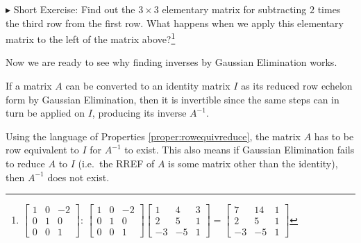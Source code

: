 $\blacktriangleright$ Short Exercise: Find out the $3 \times 3$ elementary matrix for subtracting $2$ times the third row from the first row. What happens when we apply this elementary matrix to the left of the matrix above?\footnote{$
\begin{bmatrix}
1 & 0 & -2 \\
0 & 1 & 0 \\
0 & 0 & 1
\end{bmatrix}$:  
$\begin{bmatrix}
1 & 0 & -2 \\
0 & 1 & 0 \\
0 & 0 & 1
\end{bmatrix}
\begin{bmatrix}
1 & 4 & 3 \\
2 & 5 & 1 \\
-3 & -5 & 1
\end{bmatrix}
=
\begin{bmatrix}
7 & 14 & 1 \\
2 & 5 & 1 \\
-3 & -5 & 1
\end{bmatrix}
$}\par
Now we are ready to see why finding inverses by Gaussian Elimination works.
\begin{thm}
\label{thm:Gausselimprincip}
If a matrix $A$ can be converted to an identity matrix $I$ as its reduced row echelon form by Gaussian Elimination, then it is invertible since the same steps can in turn be applied on $I$, producing its inverse $A^{-1}$. 
\end{thm}
Using the language of Properties \ref{proper:rowequivreduce}, the matrix $A$ has to be row equivalent to $I$ for $A^{-1}$ to exist. This also means if Gaussian Elimination fails to reduce $A$ to $I$ (i.e.\ the RREF of $A$ is some matrix other than the identity), then $A^{-1}$ does not exist.
